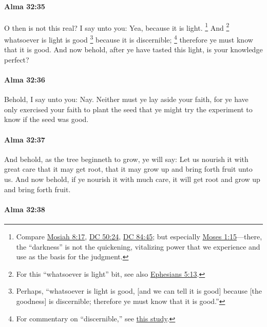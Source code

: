 		\paragraph{Alma 32:35} %
			\label{ALMA-32-35}

			O then is not this real?
			I say unto you:
			Yea, because it is light.%
				\footnote{%
					Compare \hyperref[MOSIAH-8-17]{Mosiah 8:17}, \hyperref[DC50-24]{DC 50:24}, \hyperref[DC84-45]{DC 84:45}; but especially \hyperref[MOSES-1-15]{Moses 1:15}---there, the ``darkness'' is not the quickening, vitalizing power that we experience and use as the basis for the judgment.
					}
			And
				\footnote{%
					For this ``whatsoever is light'' bit, see also \hyperref[EPHESIANS-5-13]{Ephesians 5:13}.
					}%
			whatsoever is light is good
				\footnote{%
					Perhaps, ``whatsoever is light is good, [and we can tell it is good] because [the goodness] is discernible; therefore ye must know that it is good.''
					}%
			because it is
			discernible;%
				\footnote{%
					For commentary on ``discernible,'' see \hyperref[EXSS-BOM-ALMA-32-DISCERNIBLE]{this study}.
					}
			therefore ye must know that it is good.
			And now behold, after ye have tasted this light, is your knowledge perfect?

		\paragraph{Alma 32:36} %
			\label{ALMA-32-36}

			Behold, I say unto you: Nay.
			Neither must ye lay aside your faith,
			for ye have only exercised your faith to plant the seed
			that ye might try the experiment to know if the seed was good.

		\paragraph{Alma 32:37} %
			\label{ALMA-32-37}

			And behold, as the tree beginneth to grow, ye will say:
			Let us nourish it with great care that it may get root,
			that it may grow up and bring forth fruit unto us.
			And now behold, if ye nourish it with much care,
			it will get root and grow up and bring forth fruit.

		\paragraph{Alma 32:38} %
			\label{ALMA-32-38}

